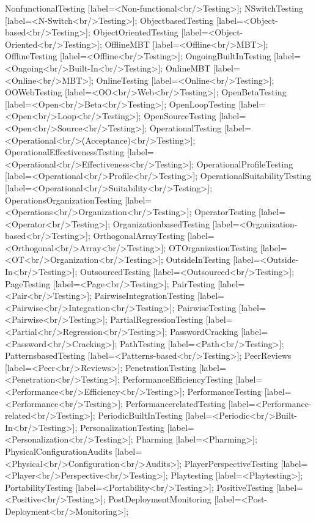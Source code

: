 \documentclass{article}
\begin{document}
{NonfunctionalTesting [label=<Non-functional<br/>Testing>];
NSwitchTesting [label=<N-Switch<br/>Testing>];
ObjectbasedTesting [label=<Object-based<br/>Testing>];
ObjectOrientedTesting [label=<Object-Oriented<br/>Testing>];
OfflineMBT [label=<Offline<br/>MBT>];
OfflineTesting [label=<Offline<br/>Testing>];
OngoingBuiltInTesting [label=<Ongoing<br/>Built-In<br/>Testing>];
OnlineMBT [label=<Online<br/>MBT>];
OnlineTesting [label=<Online<br/>Testing>];
OOWebTesting [label=<OO<br/>Web<br/>Testing>];
OpenBetaTesting [label=<Open<br/>Beta<br/>Testing>];
OpenLoopTesting [label=<Open<br/>Loop<br/>Testing>];
OpenSourceTesting [label=<Open<br/>Source<br/>Testing>];
OperationalTesting [label=<Operational<br/>(Acceptance)<br/>Testing>];
OperationalEffectivenessTesting [label=<Operational<br/>Effectiveness<br/>Testing>];
OperationalProfileTesting [label=<Operational<br/>Profile<br/>Testing>];
OperationalSuitabilityTesting [label=<Operational<br/>Suitability<br/>Testing>];
OperationsOrganizationTesting [label=<Operations<br/>Organization<br/>Testing>];
OperatorTesting [label=<Operator<br/>Testing>];
OrganizationbasedTesting [label=<Organization-based<br/>Testing>];
OrthogonalArrayTesting [label=<Orthogonal<br/>Array<br/>Testing>];
OTOrganizationTesting [label=<OT<br/>Organization<br/>Testing>];
OutsideInTesting [label=<Outside-In<br/>Testing>];
OutsourcedTesting [label=<Outsourced<br/>Testing>];
PageTesting [label=<Page<br/>Testing>];
PairTesting [label=<Pair<br/>Testing>];
PairwiseIntegrationTesting [label=<Pairwise<br/>Integration<br/>Testing>];
PairwiseTesting [label=<Pairwise<br/>Testing>];
PartialRegressionTesting [label=<Partial<br/>Regression<br/>Testing>];
PasswordCracking [label=<Password<br/>Cracking>];
PathTesting [label=<Path<br/>Testing>];
PatternsbasedTesting [label=<Patterns-based<br/>Testing>];
PeerReviews [label=<Peer<br/>Reviews>];
PenetrationTesting [label=<Penetration<br/>Testing>];
PerformanceEfficiencyTesting [label=<Performance<br/>Efficiency<br/>Testing>];
PerformanceTesting [label=<Performance<br/>Testing>];
PerformancerelatedTesting [label=<Performance-related<br/>Testing>];
PeriodicBuiltInTesting [label=<Periodic<br/>Built-In<br/>Testing>];
PersonalizationTesting [label=<Personalization<br/>Testing>];
Pharming [label=<Pharming>];
PhysicalConfigurationAudits [label=<Physical<br/>Configuration<br/>Audits>];
PlayerPerspectiveTesting [label=<Player<br/>Perspective<br/>Testing>];
Playtesting [label=<Playtesting>];
PortabilityTesting [label=<Portability<br/>Testing>];
PositiveTesting [label=<Positive<br/>Testing>];
PostDeploymentMonitoring [label=<Post-Deployment<br/>Monitoring>];
}
\end{document}

